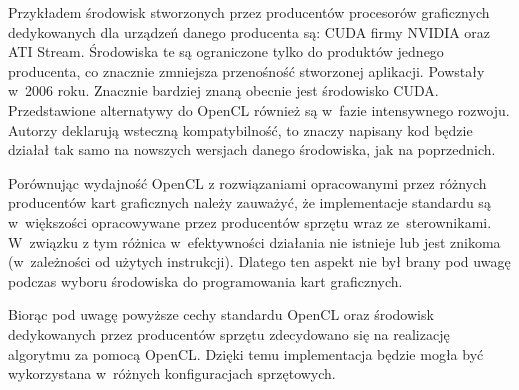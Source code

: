 Przykładem środowisk stworzonych przez producentów procesorów graficznych dedykowanych dla urządzeń danego producenta są: CUDA firmy NVIDIA oraz ATI Stream. Środowiska te są ograniczone tylko do produktów jednego producenta, co znacznie zmniejsza przenośność stworzonej aplikacji. Powstały w~2006 roku. Znacznie bardziej znaną obecnie jest środowisko CUDA. Przedstawione alternatywy do OpenCL również są w~fazie intensywnego rozwoju. Autorzy deklarują  wsteczną kompatybilność, to znaczy napisany kod będzie działał tak samo na nowszych wersjach danego środowiska, jak na poprzednich.

Porównując wydajność OpenCL z rozwiązaniami opracowanymi przez różnych producentów kart graficznych należy zauważyć, że implementacje standardu są w~większości opracowywane przez producentów sprzętu wraz ze~sterownikami. W~związku z tym różnica w~efektywności działania nie istnieje lub jest znikoma (w~zależności od użytych instrukcji)\cite{FromCudaToOpenCL}. Dlatego ten aspekt nie był brany pod uwagę podczas wyboru środowiska do programowania kart graficznych.

Biorąc pod uwagę powyższe cechy standardu OpenCL oraz środowisk dedykowanych przez producentów sprzętu zdecydowano się na realizację algorytmu za pomocą OpenCL. Dzięki temu implementacja będzie mogła być wykorzystana w~różnych konfiguracjach sprzętowych.

